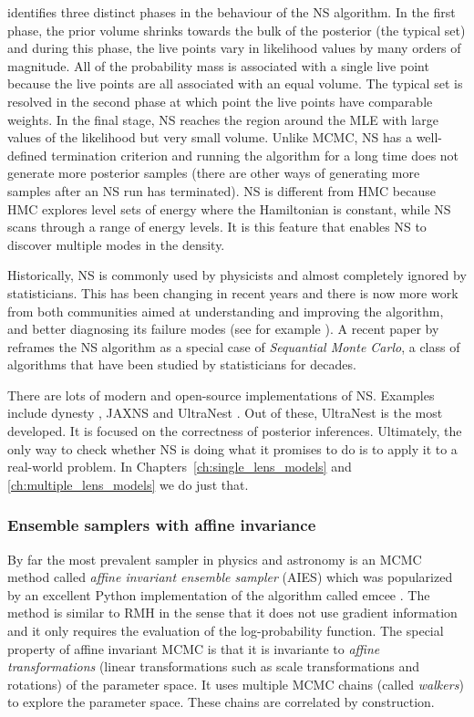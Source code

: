 \documentclass[12pt,dvipsnames]{report}
\newcommand{\ssf}[1]{\textsf{#1}}
\begin{document}
\citet{arXiv:2101.09675} identifies three distinct phases in the behaviour 
of the NS algorithm. In the first phase, the prior volume shrinks towards the 
bulk of the posterior (the typical set) and during this phase, the live points 
vary in likelihood values by many orders of magnitude. All of the probability mass is 
associated with a single live point because the live points are all associated 
with an equal volume. 
The typical set is resolved in the second phase at which point the live points have 
comparable weights.  In the final stage, NS reaches the region around the MLE 
with large values of the likelihood but very small volume.
Unlike MCMC, NS has a well-defined termination criterion and running the algorithm 
for a long time does not generate more posterior samples (there are other ways 
of generating more samples after an NS run has terminated).
NS is different from HMC because HMC explores level sets of energy where 
the Hamiltonian is constant, while NS scans through a range of energy levels. 
It is this feature that enables NS to discover multiple modes in the density.


Historically, NS is commonly used by physicists and almost completely 
ignored by statisticians. This has been changing in recent years and there 
is now more work from both communities aimed at understanding and improving the 
algorithm, and better diagnosing its failure modes (see for example 
\citet{ arXiv:1407.5459,arXiv:1804.06406,arXiv:1704.03459,arXiv:2101.09675}).
A recent paper by \citet{arXiv:1805.03924}  reframes the NS 
algorithm as a special case of \emph{Sequantial Monte Carlo}, a class of 
algorithms that have been studied by statisticians for decades.

There are lots of modern and open-source implementations of NS. Examples include
\ssf{dynesty} \citep{2020MNRAS.493.3132S}, \ssf{JAXNS} \citep{arXiv:2012.15286}
and \ssf{UltraNest} \citep{2021JOSS....6.3001B}. 
Out of these, \ssf{UltraNest} is the most developed. It is 
focused on the correctness of posterior inferences. Ultimately, the only way 
to check whether NS is doing what it promises to do is to apply it to a real-world
problem. In Chapters~\ref{ch:single_lens_models} and \ref{ch:multiple_lens_models}
we do just that.

\subsubsection{Ensemble samplers with affine invariance}
By far the most prevalent sampler in physics and astronomy is an MCMC method 
called \emph{affine invariant ensemble sampler} (AIES)
\citep{2010CAMCS...5...65G} which was popularized by an excellent \ssf{Python}
implementation of the algorithm called \ssf{emcee} 
\citep{arXiv:1202.3665,arXiv:1911.07688}. The method is similar 
to RMH  in the sense that it does not use gradient information and it only requires 
the evaluation of the log-probability function. The special property 
of affine invariant MCMC is that it is invariante to 
\emph{affine transformations} (linear transformations such as 
scale transformations and rotations) of the parameter space. It uses multiple 
MCMC chains (called \emph{walkers}) to explore the parameter space. These chains are
correlated by construction. 
\end{document}
